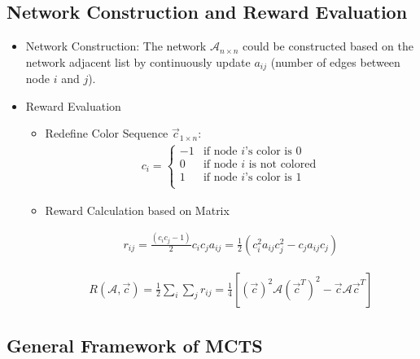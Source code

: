 \documentclass[compress]{beamer}
\begin{document}
\subsection{Network Construction and Reward Evaluation}
\begin{frame}
\begin{itemize}
  \item Network Construction: The network $\mathcal{A}_{n \times n}$ could be constructed based on the network adjacent list by continuously update $a_{ij}$ (number of edges between node $i$ and $j$). 
  \item Reward Evaluation
    \begin{itemize}
      \item Redefine Color Sequence $\vec c_{1 \times n}$:
\begin{align}
  c_{i} = \left \{
             \begin{array}{cl}
               -1 & \mbox{if node $i$'s color is 0} \\
               0 & \mbox{if node $i$ is not colored} \\
               1 & \mbox{if node $i$'s color is 1} \\
             \end{array}
          \right.
\end{align}

      \item Reward Calculation based on Matrix
        
\begin{equation}
\begin{aligned}
  r_{ij} = \frac{(c_{i}c_{j} - 1)}{2} c_{i} c_{j} a_{ij} = \frac{1}{2} (c_{i}^{2}a_{ij}c_{j}^{2} - c_{j}a_{ij}c_{j})
\end{aligned}
\end{equation}

\begin{equation}
\begin{aligned}
  R(\mathcal{A}, \vec c) =  \frac{1}{2} \sum_{i} \sum_{j} r_{ij} = \frac{1}{4} [(\vec c)^{2} \mathcal{A} (\vec c^{T})^{2} - \vec c \mathcal{A} \vec c^{T}]
\end{aligned}
\end{equation} 
    \end{itemize}
\end{itemize}
\end{frame}

\subsection{General Framework of MCTS}
\end{document}
